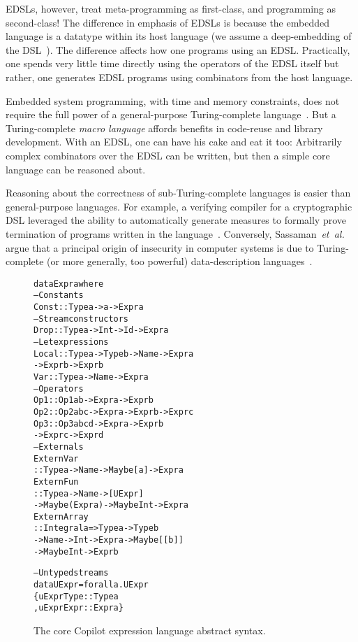 \documentclass[preprint]{sigplanconf}
\newenvironment{code}{\begin{alltt}\footnotesize}{\end{alltt}}
\begin{document}
EDSLs, however, treat meta-programming as first-class, and programming as
second-class!  The difference in emphasis of EDSLs is because the embedded
language is a datatype within its host language (we assume a deep-embedding of
the DSL~\cite{gill}).  The difference affects how one programs using an EDSL.
Practically, one spends very little time directly using the operators of the
EDSL itself but rather, one generates EDSL programs using combinators from the
host language.

Embedded system programming, with time and memory constraints, does not require
the full power of a general-purpose Turing-complete language~\cite{CaspiPHP87}.
But a Turing-complete \emph{macro language} affords benefits in code-reuse and
library development.  With an EDSL, one can have his cake and eat it too:
Arbitrarily complex combinators over the EDSL can be written, but then a simple
core language can be reasoned about.

Reasoning about the correctness of sub-Turing-complete languages is easier than
general-purpose languages.  For example, a verifying compiler for a
cryptographic DSL leveraged the ability to automatically generate measures to
formally prove termination of programs written in the language~\cite{mcrypt}.
Conversely, Sassaman~\emph{et~al.} argue that a principal origin of insecurity
in computer systems is due to Turing-complete (or more generally, too powerful)
data-description languages~\cite{turing}.

\begin{figure}[h!t]
  \begin{code}
data Expr a where
  -- Constants
  Const :: Type a -> a -> Expr a
  -- Stream constructors
  Drop  :: Type a -> Int -> Id -> Expr a
  -- Let expressions
  Local :: Type a -> Type b -> Name -> Expr a 
        -> Expr b -> Expr b
  Var   :: Type a -> Name -> Expr a 
  -- Operators
  Op1   :: Op1 a b -> Expr a -> Expr b 
  Op2   :: Op2 a b c -> Expr a -> Expr b -> Expr c
  Op3   :: Op3 a b c d -> Expr a -> Expr b 
        -> Expr c -> Expr d
  -- Externals
  ExternVar   
    :: Type a -> Name -> Maybe [a] -> Expr a 
  ExternFun   
    :: Type a -> Name -> [UExpr] 
    -> Maybe (Expr a) -> Maybe Int -> Expr a
  ExternArray 
    :: Integral a => Type a -> Type b 
    -> Name -> Int -> Expr a -> Maybe [[b]] 
    -> Maybe Int -> Expr b 

-- Untyped streams
data UExpr = forall a. UExpr
  \{ uExprType :: Type a
  , uExprExpr  :: Expr a \}
  \end{code}
\caption{The core Copilot expression language abstract syntax.\label{fig:core}}
\end{figure} 
\end{document}
